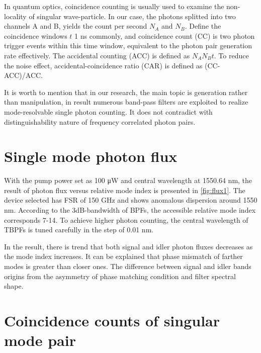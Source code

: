 In quantum optics, coincidence counting is usually used to examine the non-locality of singular wave-particle. In our case, the photons splitted into two channels A and B, yields the count per second $N_A$ and $ N_B $. Define the coincidence windows $t$ 1 ns commonly, and coincidence count (CC) is two photon trigger events within this time window, equivalent to the photon pair generation rate effectively. The accidental counting (ACC) is defined as $ N_A N_B t $. To reduce the noise effect, accidental-coincidence ratio (CAR) is defined as (CC-ACC)/ACC.


It is worth to mention that in our research, the main topic is generation rather than manipulation, in result numerous band-pass filters are exploited to realize mode-resolvable single photon counting. It does not contradict with distinguishability nature of frequency correlated photon pairs.


\section{Single mode photon flux}

With the pump power set as 100 \si{\micro\watt} and central wavelength at 1550.64 nm, the result of photon flux versus relative mode index is presented in \autoref{fig:flux1}. The device selected has FSR of 150 GHz and shows anomalous dispersion around 1550 nm. According to the 3dB-bandwidth of BPFs, the accessible relative mode index corresponds 7-14. To achieve higher photon counting, the central wavelength of TBPFs is tuned carefully in the step of 0.01 nm.

In the result, there is trend that both signal and idler photon fluxes decreases as the mode index increases. It can be explained that phase mismatch of farther modes is greater than closer ones. The difference between signal and idler bands origins from the asymmetry of phase matching condition and filter spectral shape.


\begin{figure}
	\centering
	
	\label{fig:flux1}
\end{figure}


\section{Coincidence counts of singular mode pair}

